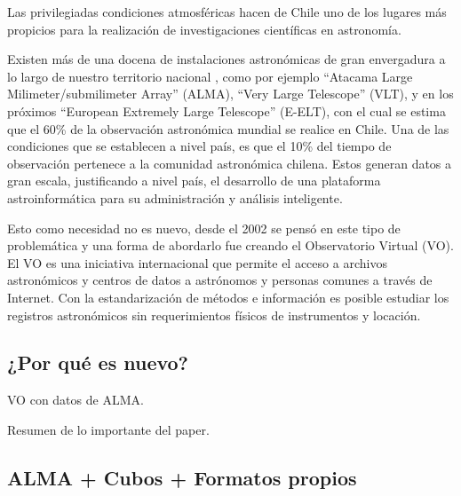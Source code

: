 Las privilegiadas condiciones atmosféricas hacen de Chile uno de los lugares más
propicios para la realización de investigaciones científicas en astronomía.

Existen más de una docena de instalaciones astronómicas de gran envergadura a lo
largo de nuestro territorio nacional \cite{observatorios_chile}, como por ejemplo
``Atacama Large Milimeter/submilimeter Array'' (ALMA), ``Very Large Telescope''
(VLT), y en los próximos ``European Extremely Large Telescope'' (E-ELT), con el cual
se estima que el 60\% de la observación astronómica mundial se realice en Chile.
Una de las condiciones que se establecen a nivel país, es que el 10\% del tiempo de
observación pertenece a la comunidad astronómica chilena.
Estos generan datos a gran escala, justificando a nivel país, el desarrollo de una
plataforma astroinformática para su administración y análisis inteligente.

Esto como necesidad no es nuevo, desde el 2002 se pensó en este tipo de problemática
y una forma de abordarlo fue creando el Observatorio Virtual (VO).
El VO es una iniciativa internacional que permite el acceso a archivos astronómicos
y centros de datos a astrónomos y personas comunes a través de Internet.
Con la estandarización de métodos e información es posible estudiar los registros
astronómicos sin requerimientos físicos de instrumentos y locación.

\subsection{¿Por qué es nuevo?}
VO con datos de ALMA.

Resumen de lo importante del paper.



\subsection{ALMA + Cubos + Formatos propios}
